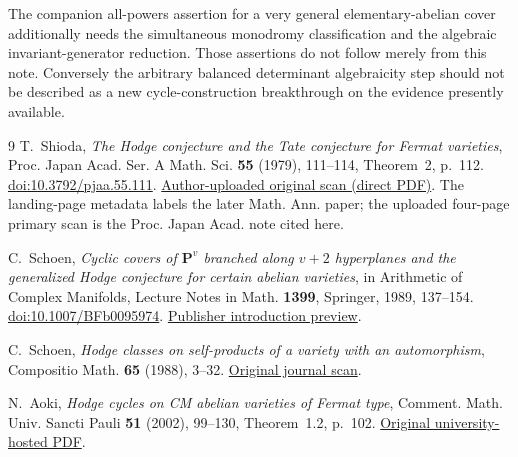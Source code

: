 \documentclass[11pt]{article}
\theoremstyle{remark}\newtheorem{remark}[theorem]{Remark}
\begin{document}
The companion all-powers assertion for a very general elementary-abelian
cover additionally needs the simultaneous monodromy classification and
the algebraic invariant-generator reduction. Those assertions do not
follow merely from this note. Conversely the arbitrary balanced determinant
algebraicity step should not be described as a new cycle-construction
breakthrough on the evidence presently available.

\begin{thebibliography}{9}
T.~Shioda, \emph{The Hodge conjecture and the Tate conjecture for Fermat
varieties}, Proc. Japan Acad. Ser. A Math. Sci. \textbf{55} (1979), 111--114,
Theorem~2, p.~112.
\href{https://doi.org/10.3792/pjaa.55.111}{doi:10.3792/pjaa.55.111}.
\href{https://www.researchgate.net/profile/Tetsuji-Shioda/publication/226509160_The_hodge_conjecture_for_Fermat_varieties/links/56716efe08ae2b1f87aef843/The-hodge-conjecture-for-Fermat-varieties.pdf}{Author-uploaded original scan (direct PDF)}.
The landing-page metadata labels the later Math. Ann. paper; the uploaded
four-page primary scan is the Proc. Japan Acad. note cited here.

C.~Schoen, \emph{Cyclic covers of $\mathbf P^v$ branched along $v+2$
hyperplanes and the generalized Hodge conjecture for certain abelian
varieties}, in Arithmetic of Complex Manifolds, Lecture Notes in Math.
\textbf{1399}, Springer, 1989, 137--154.
\href{https://doi.org/10.1007/BFb0095974}{doi:10.1007/BFb0095974}.
\href{https://page-one.springer.com/pdf/preview/10.1007/BFb0095974}{Publisher introduction preview}.

C.~Schoen, \emph{Hodge classes on self-products of a variety with an
automorphism}, Compositio Math. \textbf{65} (1988), 3--32.
\href{https://www.numdam.org/item/CM_1988__65_1_3_0.pdf}{Original journal scan}.

N.~Aoki, \emph{Hodge cycles on CM abelian varieties of Fermat type},
Comment. Math. Univ. Sancti Pauli \textbf{51} (2002), 99--130,
Theorem~1.2, p.~102.
\href{https://rikkyo.repo.nii.ac.jp/record/8744/files/AA00610867_51-01_07.pdf}{Original university-hosted PDF}.
\end{thebibliography}
\end{document}
